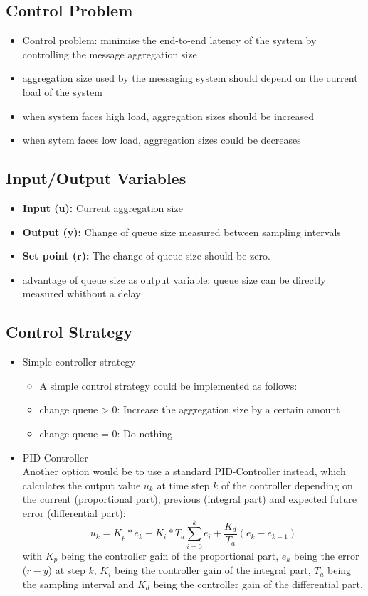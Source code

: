 \subsection{Control Problem}

\begin{itemize}
	\item Control problem: minimise the end-to-end latency of the system by controlling the message aggregation size
	\item aggregation size used by the messaging system should depend on the current load of the system
	\item when system faces high load, aggregation sizes should be increased
	\item when sytem faces low load, aggregation sizes could be decreases
\end{itemize}
\subsection{Input/Output Variables}

\begin{itemize}
	\item \textbf{Input (u):} Current aggregation size
	\item \textbf{Output (y):} Change of queue size measured between sampling intervals
	\item \textbf{Set point (r):} The change of queue size should be zero.
	\item advantage of queue size as output variable: queue size can be directly measured whithout a delay
\end{itemize}

\subsection{Control Strategy}

\begin{itemize}
	\item Simple controller strategy
	\begin{itemize}
		\item A simple control strategy could be implemented as follows:
		\item change queue > 0: Increase the aggregation size by a certain amount
		\item change queue = 0: Do nothing
	\end{itemize}
	\item PID Controller\\
	Another option would be to use a standard PID-Controller instead, which calculates the output value $u_k$ at time step $k$ of the controller depending on the current (proportional part), previous (integral part) and expected future error (differential part):
	\begin{displaymath}
	u_k=K_p*e_k+K_i*T_a\sum_{i=0}^k e_i+\frac{K_d}{T_a}(e_k-e_{k-1})
	\end{displaymath}
	with $K_p$ being the controller gain of the proportional part, $e_k$ being the error ($r-y$) at step $k$, $K_i$ being the controller gain of the integral part, $T_a$ being the sampling interval and $K_d$ being the controller gain of the differential part.
\end{itemize}

